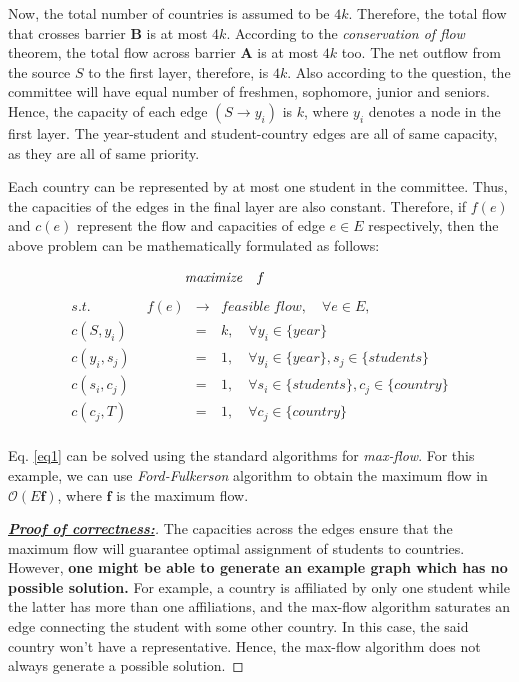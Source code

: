 \documentclass[assign]{article}
\newcommand{\Oo}{\mathcal{O}}
\newcommand{\fB}{\mathbf{f}}
\begin{document}
\noindent Now, the total number of countries is assumed to be $4k$.  Therefore, the total flow that crosses barrier \textbf{B} is at most $4k$. According to the \emph{conservation of flow} theorem, the total flow across barrier \textbf{A} is at most $4k$ too. The net outflow from the source $S$ to the first layer, therefore, is $4k$. Also according to the question, the committee will have equal number of freshmen, sophomore, junior and seniors. Hence, the capacity of each edge $(S \rightarrow y_i)$ is $k$, where $y_i$ denotes a node in the first layer.  The year-student and student-country edges are all of same capacity, as they are all of same priority. 
\par\noindent Each country can be represented by at most one student in the committee. Thus, the capacities of the edges in the final layer are also constant. Therefore,  if $f(e)$ and $c(e)$ represent the flow and capacities of edge $e \in E$ respectively, then the above problem can be mathematically formulated as follows:

\begin{equation}
\hspace{-50pt}
  \emph{maximize} \quad  f  \\
\label{eq1} 
\end{equation}
\begin{eqnarray*}
 s.t. \qquad \qquad f(e)  &\rightarrow& feasible \; flow, \quad \forall e \in E,  \\
  c(S,y_i) &=& k, \quad \forall y_i \in \{year\}  \\
  c(y_i,s_j) &=& 1, \quad \forall y_i \in \{year\}, s_j \in \{students\} \\
 c(s_i,c_j) &=& 1, \quad \forall s_i \in \{students\}, c_j  \in \{country\}  \\
 c(c_j,T) &=& 1, \quad \forall c_j \in \{country\}  \\
\end{eqnarray*}

Eq. \ref{eq1} can be solved using the standard algorithms for \emph{max-flow}. For this example, we can use \emph{Ford-Fulkerson} algorithm to obtain the maximum flow in $\Oo (E\fB)$, where $\fB$ is the maximum flow. 

\begin{proof}[\underline{\bf{Proof of correctness:}}] The capacities across the edges ensure that the maximum flow will guarantee optimal assignment of students to countries.  However, \textbf{one might be able to generate an example graph which has no possible solution.} For example, a country is affiliated by only one student while the latter has more than one affiliations, and the max-flow algorithm saturates an edge connecting  the student with some other country. In this case, the said country won't have a representative. Hence, the max-flow algorithm does not always generate a possible solution.
\end{proof}
\end{document}
